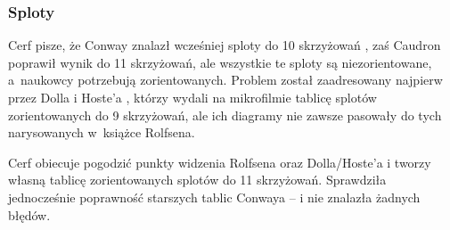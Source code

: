 \subsubsection{Sploty}
Cerf \cite{cerf98} pisze, że Conway znalazł wcześniej sploty do 10 skrzyżowań \cite{conway70}, zaś Caudron \cite{caudron82} poprawił wynik do 11 skrzyżowań, ale wszystkie te sploty są niezorientowane, a~naukowcy potrzebują zorientowanych.
Problem został zaadresowany najpierw przez Dolla i Hoste'a \cite{doll91}, którzy wydali na mikrofilmie tablicę splotów zorientowanych do 9 skrzyżowań, ale ich diagramy nie zawsze pasowały do tych narysowanych w~książce Rolfsena.

Cerf obiecuje pogodzić punkty widzenia Rolfsena oraz Dolla/Hoste'a i tworzy własną tablicę zorientowanych splotów do 11 skrzyżowań.
Sprawdziła jednocześnie poprawność starszych tablic Conwaya -- i nie znalazła żadnych błędów.

